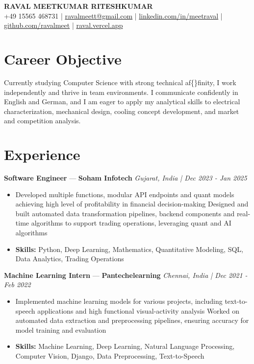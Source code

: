 \documentclass[a4paper,10pt]{article}
\begin{document}
\begin{center}
  {\Large\bfseries RAVAL MEETKUMAR RITESHKUMAR}\\[2pt]
  {\small +49 15565 468731 \;|\; \href{mailto:ravalmeett@gmail.com}{ravalmeett@gmail.com} \;|\; \href{https://www.linkedin.com/in/meetraval/}{linkedin.com/in/meetraval} \;|\; \href{https://github.com/ravalmeet}{github.com/ravalmeet} \;|\; \href{https://raval.vercel.app/}{raval.vercel.app}}
\end{center}
\vspace{-3pt}

\section*{Career Objective}
Currently studying Computer Science with strong technical af\{\}finity, I work independently and thrive in team environments. I communicate confidently in English and German, and I am eager to apply my analytical skills to electrical characterization, mechanical design, cooling concept development, and market and competition analysis.\par

\section*{Experience}
\textbf{Software Engineer} — \textbf{Soham Infotech} \hfill \textit{Gujarat, India \;|\; Dec 2023 - Jan 2025}\par
\vspace{1pt}
\begin{itemize}
  \item Developed multiple functions, modular API endpoints and quant models achieving high level of profitability in financial decision-making Designed and built automated data transformation pipelines, backend components and real-time algorithms to support trading operations, leveraging quant and AI algorithms
  \item \textbf{Skills:} Python, Deep Learning, Mathematics, Quantitative Modeling, SQL, Data Analytics, Trading Operations
\end{itemize}
\vspace{3pt}
\textbf{Machine Learning Intern} — \textbf{Pantechelearning} \hfill \textit{Chennai, India \;|\; Dec 2021 - Feb 2022}\par
\vspace{1pt}
\begin{itemize}
  \item Implemented machine learning models for various projects, including text-to-speech applications and high functional visual-activity analysis Worked on automated data extraction and preprocessing pipelines, ensuring accuracy for model training and evaluation
  \item \textbf{Skills:} Machine Learning, Deep Learning, Natural Language Processing, Computer Vision, Django, Data Preprocessing, Text-to-Speech
\end{itemize}
\end{document}
